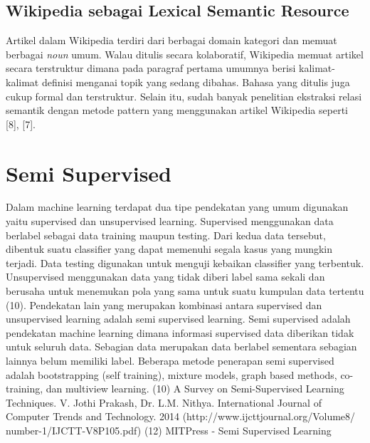 \subsection{Wikipedia sebagai Lexical Semantic Resource}
Artikel dalam Wikipedia terdiri dari berbagai domain kategori dan memuat berbagai \textit{noun} umum. Walau ditulis secara kolaboratif, Wikipedia memuat artikel secara terstruktur dimana pada paragraf pertama umumnya berisi kalimat-kalimat definisi menganai topik yang sedang dibahas. Bahasa yang ditulis juga cukup formal dan terstruktur. Selain itu, sudah banyak penelitian ekstraksi relasi semantik dengan metode pattern yang menggunakan artikel Wikipedia seperti [8], [7]. 


\section{Semi Supervised}
Dalam machine learning terdapat dua tipe pendekatan yang umum digunakan yaitu supervised dan unsupervised learning. Supervised menggunakan data berlabel sebagai data training maupun testing. Dari kedua data tersebut, dibentuk suatu classifier yang dapat memenuhi segala kasus yang mungkin terjadi. Data testing digunakan untuk menguji kebaikan classifier yang terbentuk. Unsupervised menggunakan data yang tidak diberi label sama sekali dan berusaha untuk menemukan pola yang sama untuk suatu kumpulan data tertentu (10). Pendekatan lain yang merupakan kombinasi antara supervised dan unsupervised learning adalah semi supervised learning. 
Semi supervised adalah pendekatan machine learning dimana informasi supervised data diberikan tidak untuk seluruh data. Sebagian data merupakan data berlabel sementara sebagian lainnya belum memiliki label. Beberapa metode penerapan semi supervised adalah bootstrapping (self training), mixture models, graph based methods, co-training, dan multiview learning.
(10) A Survey on Semi-Supervised Learning Techniques. V. Jothi Prakash, Dr. L.M. Nithya. International Journal of Computer Trends and Technology. 2014 (http://www.ijcttjournal.org/Volume8/
number-1/IJCTT-V8P105.pdf)
(12) MITPress - Semi Supervised Learning

